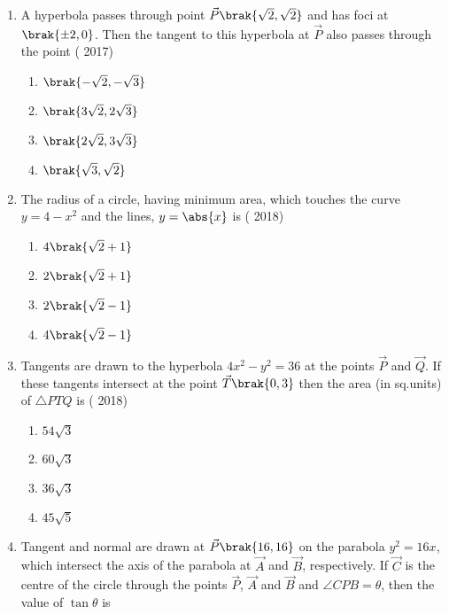 \begin{enumerate}
\item A hyperbola passes through point $\vec{P}\brak{\sqrt2,\sqrt2}$  and  has  foci  at $\brak{\pm2,0}$. Then  the  tangent  to  this  hyperbola at $\vec{P}$ also passes through the point 
      \hfill{( 2017)} 
	\begin{multicols}{4}
\begin{enumerate}
    		\item  $\brak{-\sqrt2,-\sqrt3}$
    		\item  $\brak{3\sqrt2,2\sqrt3}$
    		\item  $\brak{2\sqrt2,3\sqrt3}$
    		\item  $\brak{\sqrt3,\sqrt2}$
	\end{enumerate}
\end{multicols}
\item  The radius of a circle, having minimum area, which touches the curve $y=4-x^2$ and the lines, $y=\abs{x}$ is  
   \hfill{( 2018)}
	\begin{multicols}{2}
\begin{enumerate}
     		\item $4\brak{\sqrt2+1}$
     		\item $2\brak{\sqrt2+1}$
     		\item $2\brak{\sqrt2-1}$
     		\item $4\brak{\sqrt2-1}$
	\end{enumerate}
\end{multicols}
\item Tangents are drawn to the hyperbola $4x^2-y^2=36$ at the points $\vec{P}$ and $\vec{Q}$. If  these tangents intersect  at the point $\vec{T}\brak{0,3}$ then the area (in sq.units) of $\triangle PTQ$ is
     \hfill{( 2018)}
	\begin{multicols}{4}
\begin{enumerate}
     		\item $54\sqrt3$
     		\item $60\sqrt3$
     		\item $36\sqrt3$ 
     		\item $45\sqrt5$
	\end{enumerate}
\end{multicols}
\item Tangent and normal are drawn at $\vec{P}\brak{16,16}$ on the parabola $y^2=16x$,
which intersect the axis of the parabola at $\vec{A}$ and $\vec{B}$, respectively. If $\vec{C}$ is the centre of the circle through the points $\vec{P}$, $\vec{A}$ and $\vec{B}$ and $\angle CPB=\theta$, then the value of $\tan{\theta}$ is 

\end{enumerate}
